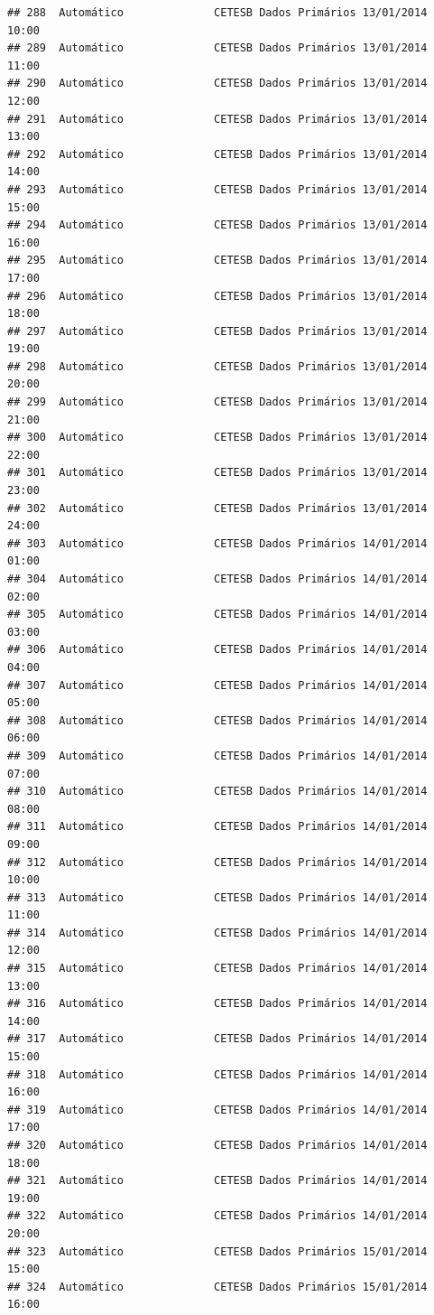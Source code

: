 \documentclass[]{book}
\begin{document}
\begin{verbatim}
## 288  Automático              CETESB Dados Primários 13/01/2014 10:00
## 289  Automático              CETESB Dados Primários 13/01/2014 11:00
## 290  Automático              CETESB Dados Primários 13/01/2014 12:00
## 291  Automático              CETESB Dados Primários 13/01/2014 13:00
## 292  Automático              CETESB Dados Primários 13/01/2014 14:00
## 293  Automático              CETESB Dados Primários 13/01/2014 15:00
## 294  Automático              CETESB Dados Primários 13/01/2014 16:00
## 295  Automático              CETESB Dados Primários 13/01/2014 17:00
## 296  Automático              CETESB Dados Primários 13/01/2014 18:00
## 297  Automático              CETESB Dados Primários 13/01/2014 19:00
## 298  Automático              CETESB Dados Primários 13/01/2014 20:00
## 299  Automático              CETESB Dados Primários 13/01/2014 21:00
## 300  Automático              CETESB Dados Primários 13/01/2014 22:00
## 301  Automático              CETESB Dados Primários 13/01/2014 23:00
## 302  Automático              CETESB Dados Primários 13/01/2014 24:00
## 303  Automático              CETESB Dados Primários 14/01/2014 01:00
## 304  Automático              CETESB Dados Primários 14/01/2014 02:00
## 305  Automático              CETESB Dados Primários 14/01/2014 03:00
## 306  Automático              CETESB Dados Primários 14/01/2014 04:00
## 307  Automático              CETESB Dados Primários 14/01/2014 05:00
## 308  Automático              CETESB Dados Primários 14/01/2014 06:00
## 309  Automático              CETESB Dados Primários 14/01/2014 07:00
## 310  Automático              CETESB Dados Primários 14/01/2014 08:00
## 311  Automático              CETESB Dados Primários 14/01/2014 09:00
## 312  Automático              CETESB Dados Primários 14/01/2014 10:00
## 313  Automático              CETESB Dados Primários 14/01/2014 11:00
## 314  Automático              CETESB Dados Primários 14/01/2014 12:00
## 315  Automático              CETESB Dados Primários 14/01/2014 13:00
## 316  Automático              CETESB Dados Primários 14/01/2014 14:00
## 317  Automático              CETESB Dados Primários 14/01/2014 15:00
## 318  Automático              CETESB Dados Primários 14/01/2014 16:00
## 319  Automático              CETESB Dados Primários 14/01/2014 17:00
## 320  Automático              CETESB Dados Primários 14/01/2014 18:00
## 321  Automático              CETESB Dados Primários 14/01/2014 19:00
## 322  Automático              CETESB Dados Primários 14/01/2014 20:00
## 323  Automático              CETESB Dados Primários 15/01/2014 15:00
## 324  Automático              CETESB Dados Primários 15/01/2014 16:00

\end{verbatim}
\end{document}
